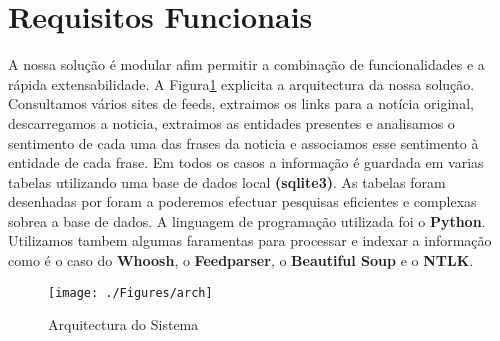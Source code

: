 \section{Requisitos Funcionais}
\hspace{15pt}A nossa solução é modular afim permitir a combinação de funcionalidades e a rápida extensabilidade. A Figura\ref{fig:arch} explicita a arquitectura da nossa solução. Consultamos vários sites de feeds, extraimos os links para a notícia original, descarregamos a noticia, extraimos as entidades presentes e analisamos o sentimento de cada uma das frases da noticia e associamos esse sentimento à entidade de cada frase. Em todos os casos a informação é guardada em varias tabelas utilizando uma base de dados local \textbf{(sqlite3)}. As tabelas foram desenhadas por foram a poderemos efectuar pesquisas eficientes e complexas sobrea a base de dados. A linguagem de programação utilizada foi o \textbf{Python}. Utilizamos tambem algumas faramentas para processar e indexar a informação como é o caso do \textbf{Whoosh}, o \textbf{Feedparser}, o \textbf{Beautiful Soup} e o \textbf{NTLK}.
\begin{figure}[ht!]
\centering
\texttt{[image: ./Figures/arch]}
\caption{Arquitectura do Sistema}
\label{fig:arch}
\end{figure}
